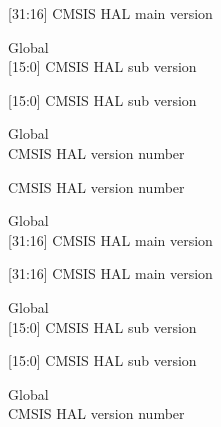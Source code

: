 \begin{DoxyRefList}
\label{deprecated__deprecated000779}%
%
\mbox{[}31\+:16\mbox{]} CMSIS HAL main version  
\item[Global \doxylink{_core_2_include_2core__armv8mbl_8h_aaf33addabe421d1792882dc889f449c2}{\+\_\+\+\_\+\+ARMv8\+MBL\+\_\+\+CMSIS\+\_\+\+VERSION\+\_\+\+SUB} ]\hfill \\
\label{deprecated__deprecated000102}%
%
\mbox{[}15\+:0\mbox{]} CMSIS HAL sub version 

\label{deprecated__deprecated000780}%
%
\mbox{[}15\+:0\mbox{]} CMSIS HAL sub version  
\item[Global \doxylink{_core_2_include_2core__armv8mml_8h_ac4ca8d84908fe15a41d4893b797916aa}{\+\_\+\+\_\+\+ARMv8\+MML\+\_\+\+CMSIS\+\_\+\+VERSION} ]\hfill \\
\label{deprecated__deprecated000157}%
%
CMSIS HAL version number 

\label{deprecated__deprecated000835}%
%
CMSIS HAL version number  
\item[Global \doxylink{_core_2_include_2core__armv8mml_8h_a944c72e5a3750004b62e7c49f6138563}{\+\_\+\+\_\+\+ARMv8\+MML\+\_\+\+CMSIS\+\_\+\+VERSION\+\_\+\+MAIN} ]\hfill \\
\label{deprecated__deprecated000155}%
%
\mbox{[}31\+:16\mbox{]} CMSIS HAL main version 

\label{deprecated__deprecated000833}%
%
\mbox{[}31\+:16\mbox{]} CMSIS HAL main version  
\item[Global \doxylink{_core_2_include_2core__armv8mml_8h_a2562fe5bfb80c16579c2af7241c1cbf2}{\+\_\+\+\_\+\+ARMv8\+MML\+\_\+\+CMSIS\+\_\+\+VERSION\+\_\+\+SUB} ]\hfill \\
\label{deprecated__deprecated000156}%
%
\mbox{[}15\+:0\mbox{]} CMSIS HAL sub version 

\label{deprecated__deprecated000834}%
%
\mbox{[}15\+:0\mbox{]} CMSIS HAL sub version  
\item[Global \doxylink{_core_2_include_2core__cm0_8h_af233a7b7b2818cc6194e7a9386faccd8}{\+\_\+\+\_\+\+CM0\+\_\+\+CMSIS\+\_\+\+VERSION} ]\hfill \\
\label{deprecated__deprecated000233}%
%
CMSIS HAL version number 


\end{DoxyRefList}
